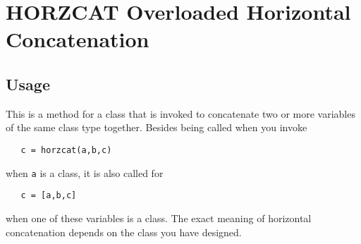 \section{HORZCAT Overloaded Horizontal Concatenation}

\subsection{Usage}

This is a method for a class that is invoked to concatenate two or more
variables of the same class type together.  Besides being called
when you invoke
\begin{verbatim}
   c = horzcat(a,b,c)
\end{verbatim}
when \verb|a| is a class, it is also called for 
\begin{verbatim}
   c = [a,b,c]
\end{verbatim}
when one of these variables is a class.  The exact meaning of
horizontal concatenation depends on the class you have designed.
